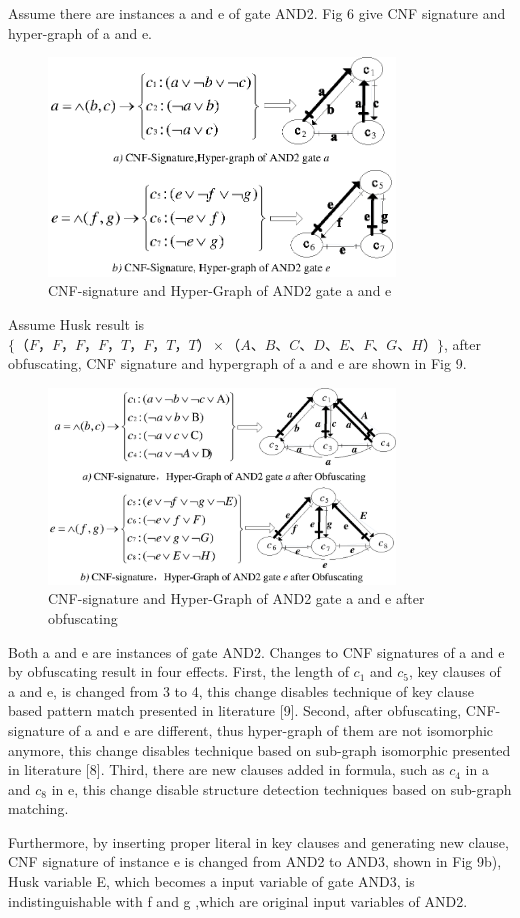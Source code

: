 \documentclass[runningheads,a4paper]{llncs}
\begin{document}
\setlength{\parindent}{2em} 
Assume there are instances a and e of gate AND2. Fig 6 give CNF signature and hyper-graph of a and e.
\begin{figure}
\centering
\includegraphics[width=9.2cm]{a6}
\caption{CNF-signature and Hyper-Graph of AND2 gate a and e}
\end{figure}
Assume Husk result is $\{（F，F，F，F，T，F，T，T）\times（A、B、C、D、E、F、G、H）\}$, after obfuscating, CNF signature and hypergraph of a and e are shown in Fig 9.
\begin{figure}
\centering
\includegraphics[width=9.2cm]{a7}
\caption{CNF-signature and Hyper-Graph of AND2 gate a and e after obfuscating}
\end{figure}
Both a and e are instances of gate AND2. Changes to CNF signatures of a and e by obfuscating result in four effects. First, the length of $c_1$ and $c_5$, key clauses of a and e, is changed from 3 to 4, this change disables technique of key clause based pattern match presented in literature [9]. Second, after obfuscating, CNF-signature of a and e are different, thus hyper-graph of them are not isomorphic anymore, this change disables technique based on sub-graph isomorphic presented in literature [8]. Third, there are new clauses added in formula, such as $c_4$ in a and $c_8$ in e, this change disable structure detection techniques based on sub-graph matching. 

Furthermore, by inserting proper literal in key clauses and generating new clause, CNF signature of instance e is changed from AND2 to AND3, shown in Fig 9b), Husk variable E, which becomes a input variable of gate AND3, is indistinguishable with f and g ,which are original input variables of AND2.
\end{document}
